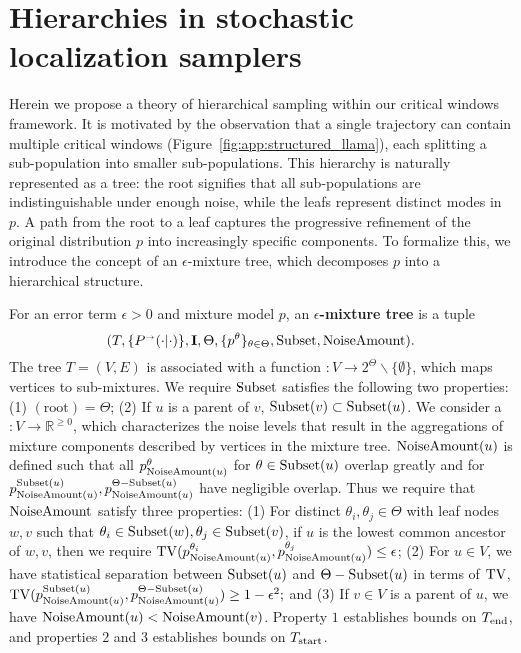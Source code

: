 \section{Hierarchies in stochastic localization samplers} \label{sec:hierarchy}

Herein we propose a theory of hierarchical sampling within our critical windows framework. 
It is motivated by the observation that a single trajectory can contain multiple critical windows (Figure~\ref{fig:app:structured_llama}), each splitting a sub-population into smaller sub-populations. This hierarchy is naturally represented as a tree: the root signifies that all sub-populations are indistinguishable under enough noise, while the leafs represent distinct modes in $p$. A path from the root to a leaf captures the progressive refinement of the original distribution $p$ into increasingly specific components. To formalize this, we introduce the concept of an $\epsilon$-mixture tree, which decomposes $p$ into a hierarchical structure. 

\begin{definition}\label{def:hierarchy:tree}
For an error term $\epsilon>0$ and mixture model $p$,  an \textbf{$\epsilon$-mixture tree} is a tuple $$(T,\{\kernelforward(\cdot  |\cdot)\},\I,\Theta,\{p^\theta\}_{\theta \in \Theta},\text{\subsetfunc},\text{\noiseamount}).$$ The tree $T=(V,E)$ is associated with a function \subsetfunc$:V\to 2^{\Theta}\backslash\{\emptyset\}$, which maps vertices to sub-mixtures. We require $\textrm{Subset}$ satisfies the following two properties: (1) \subsetfunc$(\textrm{root})=\Theta$; (2) If $u$ is a parent of $v$, $\textrm{Subset}(v) \subset \textrm{Subset}(u)$. We consider a \noiseamount$:V \to \mathbb{R}^{ \geq 0}$, which characterizes the noise levels that result in the aggregations of mixture components described by vertices in the mixture tree. $\text{\textrm{NoiseAmount}}(u)$ is defined such that all $p^\theta_{\text{\textrm{NoiseAmount}}(u)}$ for $\theta \in \text{\textrm{Subset}}(u)$ overlap greatly and for $p^{\text{\textrm{Subset}}(u)}_{\text{\textrm{NoiseAmount}}(u)},p^{\Theta-\text{\textrm{Subset}}(u)}_{\text{\textrm{NoiseAmount}}(u)}$ have negligible overlap. Thus we require that $\textrm{NoiseAmount}$ satisfy three properties: (1) For distinct $\theta_i,\theta_j \in \Theta$ with leaf nodes $w,v$ such that $\theta_i \in \textrm{Subset}(w), \theta_j \in \textrm{Subset}(v)$, if $u$ is the lowest common ancestor of $w,v$, then we require $\mathrm{TV}(p^{\theta_i}_{\textrm{NoiseAmount}(u)},p^{\theta_j}_{\textrm{NoiseAmount}(u)}) \leq \epsilon$; (2) For $u \in V$, we have statistical separation between $\textrm{Subset}(u)$ and $\Theta-\textrm{Subset}(u)$ in terms of $\mathrm{TV}$, $\mathrm{TV}(p^{\textrm{Subset}(u)}_{\textrm{NoiseAmount}(u)},p^{\Theta-\textrm{Subset}(u)}_{\textrm{NoiseAmount}(u)}) \geq 1-\epsilon^2;$ and (3) If $v \in V$ is a parent of $u$, we have $\textrm{NoiseAmount}(u) < \textrm{NoiseAmount}(v)$. Property $1$ establishes bounds on $T_{\mathrm{end}}$, and properties $2$ and $3$ establishes bounds on $T_{\mathrm{start}}$.
\end{definition}


